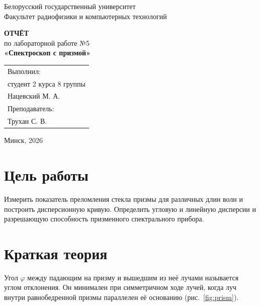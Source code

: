 \documentclass[14pt,a4paper]{extarticle}
\begin{document}
\begin{titlepage}
\begin{center}
\onehalfspacing
Белорусский государственный университет\\
Факультет радиофизики и компьютерных технологий

\vspace{4cm}

\textbf{ОТЧЁТ}\\
по лабораторной работе №5\\[0.3cm]
\textbf{«Спектроскоп с призмой»}

\vspace{4cm}

\begin{flushright}
\begin{tabular}{@{}p{7.5cm}@{}}
\raggedright
Выполнил:\\
студент 2 курса 8 группы\\
Нацевский М. А.\\
Преподаватель:\\
Трухан С. В.\\
\end{tabular}
\end{flushright}

\vfill
Минск, 2026
\end{center}
\end{titlepage}
\setcounter{page}{2}

\section*{Цель работы}

Измерить показатель преломления стекла призмы для различных длин волн и построить дисперсионную кривую. Определить угловую и линейную дисперсии и разрешающую способность призменного спектрального прибора.

\section*{Краткая теория}

Угол $\varphi$ между падающим на призму и вышедшим из неё лучами называется углом отклонения. Он минимален при симметричном ходе лучей, когда луч внутри равнобедренной призмы параллелен её основанию (рис.~\ref{fig:prism}).
\end{document}
